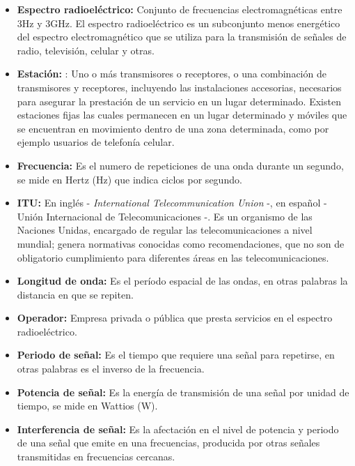 \begin{itemize}
\item \textbf{Espectro radioeléctrico:} \cite{Cuadro} Conjunto de frecuencias electromagnéticas entre 3Hz y 3GHz. El espectro radioeléctrico es un subconjunto menos energético del espectro electromagnético que se utiliza para la transmisión de señales de radio, televisión, celular y otras.

\item \textbf{Estación:} \cite{Cuadro}: Uno o más transmisores o receptores, o una combinación de transmisores y receptores, incluyendo las instalaciones accesorias, necesarios para asegurar la prestación de un servicio en un lugar determinado. Existen estaciones fijas las cuales permanecen en un lugar determinado y móviles que se encuentran en movimiento dentro de una zona determinada, como por ejemplo usuarios de telefonía celular.

\item \textbf{Frecuencia:} \cite{Cuadro} Es el numero de repeticiones de una onda durante un segundo, se mide en Hertz (Hz) que indica ciclos por segundo.

\item \textbf{ITU:} \cite{ITU} En inglés  - \textit{International Telecommunication Union} -, en español - Unión Internacional de Telecomunicaciones -. Es un organismo de las Naciones Unidas, encargado de regular las telecomunicaciones a nivel mundial; genera normativas conocidas como recomendaciones, que no son de obligatorio cumplimiento para diferentes áreas en las telecomunicaciones.

\item \textbf{Longitud de onda:} \cite{Cuadro} Es el período espacial de las ondas, en otras palabras la distancia en que se repiten.

\item \textbf{Operador:} Empresa privada o pública que presta servicios en el espectro radioeléctrico.

\item \textbf{Periodo de señal:} \cite{Cuadro} Es el tiempo que requiere una señal para repetirse, en otras palabras es el inverso de la frecuencia.

\item \textbf{Potencia de señal:} \cite{Cuadro} Es la energía de transmisión de una señal por unidad de tiempo, se mide en Wattios (W).

\item \textbf{Interferencia de señal:} \cite{Cuadro} Es la afectación en el nivel de potencia y periodo de una señal que emite en una frecuencias, producida por otras señales transmitidas en frecuencias cercanas.


\end{itemize}
